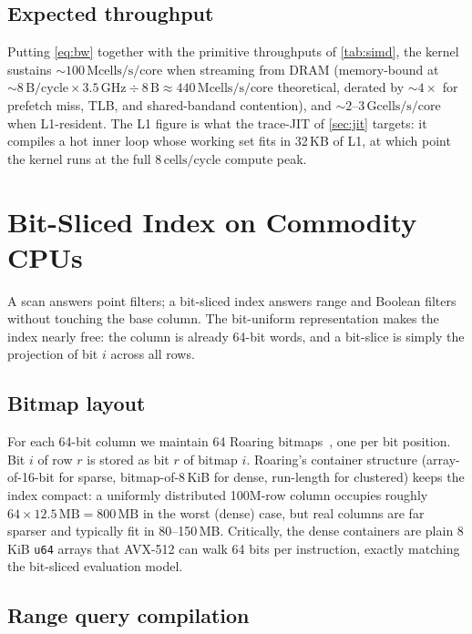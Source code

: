 \documentclass[10pt]{article}
\theoremstyle{definition}
\begin{document}
\subsection{Expected throughput}

Putting \cref{eq:bw} together with the primitive throughputs of \cref{tab:simd}, the kernel sustains $\sim\!100\,\text{Mcells/s/core}$ when streaming from DRAM (memory-bound at $\sim\!8\,\text{B/cycle} \times 3.5\,\text{GHz} \div 8\,\text{B} \approx 440\,\text{Mcells/s/core}$ theoretical, derated by $\sim\!4\times$ for prefetch miss, TLB, and shared-bandand contention), and $\sim\!2$--$3\,\text{Gcells/s/core}$ when L1-resident. The L1 figure is what the trace-JIT of \cref{sec:jit} targets: it compiles a hot inner loop whose working set fits in 32\,KB of L1, at which point the kernel runs at the full $8\,\text{cells/cycle}$ compute peak.

\section{Bit-Sliced Index on Commodity CPUs}

A scan answers point filters; a bit-sliced index answers range and Boolean filters without touching the base column. The bit-uniform representation makes the index nearly free: the column is already 64-bit words, and a bit-slice is simply the projection of bit $i$ across all rows.

\subsection{Bitmap layout}

For each 64-bit column we maintain 64 Roaring bitmaps~\citep{roaring,roaring_impl}, one per bit position. Bit $i$ of row $r$ is stored as bit $r$ of bitmap $i$. Roaring's container structure (array-of-16-bit for sparse, bitmap-of-8\,KiB for dense, run-length for clustered) keeps the index compact: a uniformly distributed 100M-row column occupies roughly $64 \times 12.5\,\text{MB} = 800\,\text{MB}$ in the worst (dense) case, but real columns are far sparser and typically fit in 80--150\,MB. Critically, the dense containers are plain 8\,KiB \texttt{u64} arrays that AVX-512 can walk 64 bits per instruction, exactly matching the bit-sliced evaluation model.

\subsection{Range query compilation}
\end{document}
